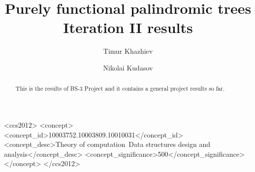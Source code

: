 \documentclass[sigconf]{acmart}
\begin{document}
\title{Purely functional palindromic trees \\ Iteration II results}


\author{Timur Khazhiev}

\author{Nikolai Kudasov}

\begin{abstract}
  This is the results of BS-3 Project and it contains
  a general project results so far.
\end{abstract}

%
%
\begin{CCSXML}
<ccs2012>
<concept>
<concept_id>10003752.10003809.10010031</concept_id>
<concept_desc>Theory of computation~Data structures design and analysis</concept_desc>
<concept_significance>500</concept_significance>
</concept>
</ccs2012>
\end{CCSXML}



\maketitle





\end{document}
